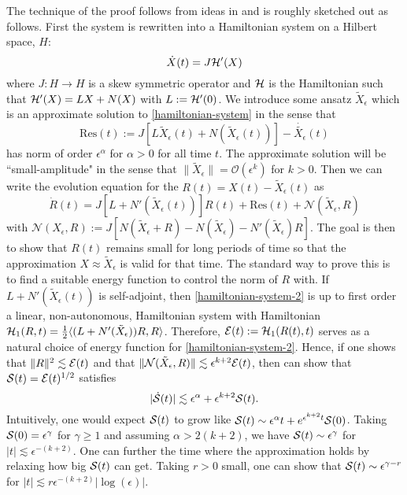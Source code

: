 The technique of the proof follows from ideas in \cite{schneider2000counter,khan2017long} and is roughly sketched out as follows. First the system is rewritten into a Hamiltonian system on a Hilbert space, \(H\):
\begin{equation}\label{hamiltonian-system}
	\dot X(t) = J \mathcal{H}'(X)
\end{equation}
where \(J:H\to H\) is a skew symmetric operator and \(\mathcal{H}\) is the Hamiltonian such that \(\mathcal{H}'(X) = LX + N(X)\) with \(L:= \mathcal{H}'(0)\). We introduce some ansatz \(\tilde X_\epsilon\) which is an approximate solution to \cref{hamiltonian-system} in the sense that 
\begin{equation}
	\mathrm{Res}(t) := J[L\tilde X_\epsilon(t)  + N(\tilde X_\epsilon(t))] - \dot{\tilde {X_\epsilon}}(t) 
\end{equation}
has norm of order \(\epsilon^\alpha\) for \(\alpha > 0\)  for all time \(t\). The approximate solution will be ``small-amplitude" in the sense that \(\| \tilde X_\epsilon \| = \mathcal O(\epsilon^k)\) for \(k > 0 \). Then we can write the evolution equation for the \(R(t) = X(t) - \tilde X_\epsilon(t)\) as 
\begin{equation}\label{hamiltonian-system-2}
	\dot R(t) = J[L + N'(\tilde X_\epsilon(t))]R(t) + \mathrm{Res}(t) + \mathcal N(\tilde X_\epsilon, R)
\end{equation}
with \(\mathcal N( X_\epsilon, R) := J[N(\tilde X_\epsilon +R) - N(\tilde X_\epsilon) - N'(\tilde X_\epsilon)R]\). The goal is then to show that \(R(t)\) remains small for long periods of time so that the approximation \(X \approx \tilde X_\epsilon\) is valid for that time. The standard way to prove this is to find a suitable energy function to control the norm of \(R\) with. If \(L + N'(\tilde X_\epsilon(t))\) is self-adjoint, then \cref{hamiltonian-system-2} is up to first order a linear, non-autonomous, Hamiltonian system with Hamiltonian \(\mathcal{H}_1(R, t) = \frac 1 2 \langle (L+N'(\tilde X_\epsilon)) R, R\rangle\). Therefore, \(\mathcal{E}(t) := \mathcal{H}_1(R(t),t)\) serves as a natural choice of energy function for \cref{hamiltonian-system-2}. Hence, if one shows that \( \| R\|^2\lesssim\mathcal{E}(t)\) and that  \(\|\mathcal N(\tilde X_\epsilon, R) \| \lesssim \epsilon^{k+2} \mathcal{E}(t)\), then can show that \(\mathcal{S}(t) = \mathcal{E}(t)^{1/2}\) satisfies
\begin{equation}
	|\dot {\mathcal{S}} (t) | \lesssim \epsilon^{\alpha} + \epsilon^{k+2}\mathcal{S}(t).
\end{equation}
Intuitively, one would expect \(\mathcal{S}(t)\) to grow like \(\mathcal{S}(t) \sim \epsilon^\alpha t + e^{\epsilon^{k+2} t} \mathcal{S}(0)\). Taking \(\mathcal{S}(0) =\epsilon^\gamma\) for \(\gamma \geq 1\) and assuming \(\alpha > 2(k+2)\), we have \(\mathcal{S}(t) \sim \epsilon^\gamma \) for \(|t|\lesssim \epsilon^{-(k+2)}\). One can further the time where the approximation holds by relaxing how big \(\mathcal{S}(t)\) can get. Taking \(r>0\) small, one can show that \(\mathcal{S}(t) \sim \epsilon^{\gamma - r}\) for \(|t| \lesssim r \epsilon^{-(k+2)}|\log(\epsilon)|\).

